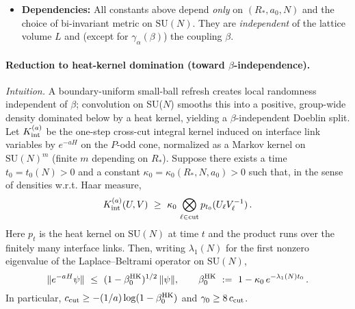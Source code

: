 \documentclass[11pt]{amsart}
\begin{document}
\begin{center}
{{\begin{itemize}
\begin{itemize}
      \item $\gamma_{\rm cut} = 8 c_{\rm cut}$: $\beta$-independent spectral gap floor (lattice units)
      \item $\gamma_{\rm cut,phys} = 8 c_{\rm cut,phys}$: $\beta$-independent spectral gap floor (physical units)
      \item $\gamma_{\alpha}(\beta) = -\log(2\beta J_{\perp})$: Dobrushin gap (valid for $2\beta J_{\perp} < 1$)
      \item $\gamma_0 = \max\{\gamma_{\alpha}(\beta), \gamma_{\rm cut}\}$: best-of-two uniform gap
    \end{itemize}
  \item \textbf{Dependencies:} All constants above depend \emph{only} on $(R_*, a_0, N)$ and the choice of bi-invariant metric on $\mathrm{SU}(N)$. They are \emph{independent} of the lattice volume $L$ and (except for $\gamma_{\alpha}(\beta)$) the coupling $\beta$.
\end{itemize}
}}
\end{center}

\paragraph{Reduction to heat-kernel domination (toward $\beta$-independence).} \emph{Intuition.} A boundary-uniform small-ball refresh creates local randomness independent of $\beta$; convolution on SU($N$) smooths this into a positive, group-wide density dominated below by a heat kernel, yielding a $\beta$-independent Doeblin split.
Let $K_{\rm int}^{(a)}$ be the one-step cross-cut integral kernel induced on interface link variables by $e^{-aH}$ on the $P$-odd cone, normalized as a Markov kernel on $\mathrm{SU}(N)^m$ (finite $m$ depending on $R_*$). Suppose there exists a time $t_0=t_0(N)>0$ and a constant $\kappa_0=\kappa_0(R_*,N,a_0)>0$ such that, in the sense of densities w.r.t. Haar measure,
\[
  K_{\rm int}^{(a)}(U,V)\ \ge\ \kappa_0\,\bigotimes_{\ell\in \text{cut}} p_{t_0}(U_\ell V_\ell^{-1})\,.
\]
Here $p_{t}$ is the heat kernel on $\mathrm{SU}(N)$ at time $t$ and the product runs over the finitely many interface links. Then, writing $\lambda_1(N)$ for the first nonzero eigenvalue of the Laplace--Beltrami operator on $\mathrm{SU}(N)$,
\[
  \|e^{-aH}\psi\|\ \le\ (1-\beta_0^{\rm HK})^{1/2}\,\|\psi\|,\qquad
  \beta_0^{\rm HK}\ :=\ 1-\kappa_0\,e^{-\lambda_1(N) t_0}\,.
\]
In particular, $c_{\rm cut}\ge -(1/a)\log(1-\beta_0^{\rm HK})$ and $\gamma_0\ge 8\,c_{\rm cut}$.
\end{document}
